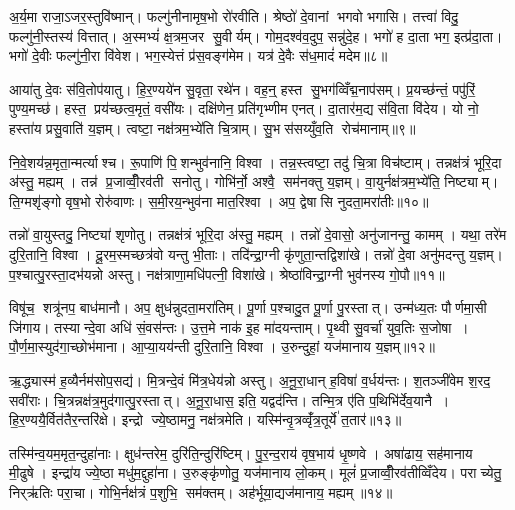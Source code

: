 अ॒र्य॒मा राजा॒ऽजर॒स्तुवि॑ष्मान्। फल्गु॑नीनामृष॒भो रो॑रवीति। श्रेष्ठो॑ दे॒वानां भगवो भगासि। तत्त्वा॑ विदु॒ फल्गु॑नी॒स्तस्य॑ वित्तात्। अ॒स्मभ्यं॑ क्ष॒त्रम॒जर सु॒वीर्यम्। गोम॒दश्व॑व॒दुप॒ सन्नु॑दे॒ह। भगो॑ ह दा॒ता भग॒ इत्प्र॑दा॒ता। भगो॑ दे॒वीः फल्गु॑नी॒रा वि॑वेश। भग॒स्येत्तं प्र॑स॒वङ्ग॑मेम। यत्र॑ दे॒वैः स॑ध॒मादं॑ मदेम॥८॥

आया॑तु दे॒वः स॑वि॒तोप॑यातु। हि॒र॒ण्यये॑न सु॒वृता॒ रथे॑न। वह॒न्॒ हस्त सु॒भग॑व्विँद्म॒नाप॑सम्। प्र॒यच्छ॑न्तं॒ पपु॑रिं॒ पुण्य॒मच्छ॑। हस्त॒ प्रय॑च्छत्व॒मृतं॒ वसी॑यः। दक्षि॑णेन॒ प्रति॑गृभ्णीम एनत्। दा॒तार॑म॒द्य स॑वि॒ता वि॑देय। यो नो॒ हस्ता॑य प्रसु॒वाति॑ य॒ज्ञम्। त्वष्टा॒ नक्ष॑त्रम॒भ्ये॑ति चि॒त्राम्। सु॒भस॑सय्युँव॒ति रोच॑मानाम्॥९॥

नि॒वे॒शय॑न्न॒मृता॒न्मर्त्याश्च। रू॒पाणि॑ पि॒शन्भुव॑नानि॒ विश्वा। तन्न॒स्त्वष्टा॒ तदु॑ चि॒त्रा विच॑ष्टाम्। तन्नक्ष॑त्रं भूरि॒दा अ॑स्तु॒ मह्यम्। तन्न॑ प्र॒जाव्वीँ॒रव॑ती सनोतु। गोभि॑र्नो॒ अश्वै॒ सम॑नक्तु य॒ज्ञम्। वा॒युर्नक्ष॑त्रम॒भ्ये॑ति॒ निष्ट्याम्। ति॒ग्मशृ॑ङ्गो वृष॒भो रोरु॑वाणः। स॒मी॒रय॒न्भुव॑ना मात॒रिश्वा। अप॒ द्वेषासि नुदता॒मरा॑तीः॥१०॥

तन्नो॑ वा॒युस्तदु॒ निष्ट्या॑ शृणोतु। तन्नक्ष॑त्रं भूरि॒दा अ॑स्तु॒ मह्यम्। तन्नो॑ दे॒वासो॒ अनु॑जानन्तु॒ कामम्। यथा॒ तरे॑म दुरि॒तानि॒ विश्वा। दू॒रम॒स्मच्छत्र॑वो यन्तु भी॒ताः। तदि॑न्द्रा॒ग्नी कृ॑णुता॒न्तद्विशा॑खे। तन्नो॑ दे॒वा अनु॑मदन्तु य॒ज्ञम्। प॒श्चात्पु॒रस्ता॒दभ॑यन्नो अस्तु। नक्ष॑त्राणा॒मधि॑पत्नी॒ विशा॑खे। श्रेष्ठा॑विन्द्रा॒ग्नी भुव॑नस्य गो॒पौ॥११॥

विषू॑च॒ शत्रू॑नप॒ बाध॑मानौ। अप॒ क्षुध॑न्नुदता॒मरा॑तिम्। पू॒र्णा प॒श्चादु॒त पू॒र्णा पु॒रस्तात्। उन्म॑ध्य॒तः पौर्णमा॒सी जि॑गाय। तस्यान्दे॒वा अधि॑ सं॒वस॑न्तः। उ॒त्त॒मे नाक॑ इ॒ह मा॑दयन्ताम्। पृ॒थ्वी सु॒वर्चा॑ युव॒तिः स॒जोषा। पौ॒र्ण॒मा॒स्युद॑गा॒च्छोभ॑माना। आ॒प्या॒यय॑न्ती दुरि॒तानि॒ विश्वा। उ॒रुन्दुहां॒ यज॑मानाय य॒ज्ञम्॥१२॥\anuvakamend[चि॒त्रभा॑नु॒र्यज॑माने दधातु ह॒विर्न॒ पाथ॒श्चेतो॑ जुषन्ता॒ञ्चेतो॑ मदेम॒ रोच॑माना॒मरा॑तीर्गो॒पौ य॒ज्ञम्]

ऋ॒द्ध्यास्म॑ ह॒व्यैर्नम॑सोप॒सद्य॑। मि॒त्रन्दे॒वं मि॑त्र॒धेय॑न्नो अस्तु। अ॒नू॒रा॒धान् ह॒विषा॑ व॒र्धय॑न्तः। श॒तञ्जी॑वेम श॒रद॒ सवी॑राः। चि॒त्रन्नक्ष॑त्र॒मुद॑गात्पु॒रस्तात्। अ॒नू॒रा॒धास॒ इति॒ यद्वद॑न्ति। तन्मि॒त्र ए॑ति प॒थिभि॑र्देव॒यानै। हि॒र॒ण्ययै॒र्वित॑तैर॒न्तरि॑क्षे। इन्द्रो ज्ये॒ष्ठामनु॒ नक्ष॑त्रमेति। यस्मि॑न्वृ॒त्रव्वृँ॑त्र॒तूर्ये॑ त॒तार॑॥१३॥

तस्मि॑न्व॒यम॒मृत॒न्दुहा॑नाः। क्षुध॑न्तरेम॒ दुरि॑ति॒न्दुरि॑ष्टिम्। पु॒र॒न्द॒राय॑ वृष॒भाय॑ धृ॒ष्णवे। अषा॑ढाय॒ सह॑मानाय मी॒ढुषे। इन्द्रा॑य ज्ये॒ष्ठा मधु॑म॒द्दुहा॑ना। उ॒रुङ्कृ॑णोतु॒ यज॑मानाय लो॒कम्। मूलं॑ प्र॒जाव्वीँ॒रव॑तीव्विँदेय। पराच्येतु॒ निर्‌ऋ॑तिः परा॒चा। गोभि॒र्नक्ष॑त्रं प॒शुभि॒ सम॑क्तम्। अह॑र्भूया॒द्यज॑मानाय॒ मह्यम्॥१४॥

